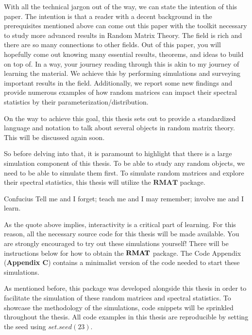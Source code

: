 With all the technical jargon out of the way, we can state the intention of this paper.
The intention is that a reader with a decent background in the prerequisites mentioned above can come out this paper with the toolkit necessary to study more advanced results in Random Matrix Theory.
The field is rich and there are so many connections to other fields. Out of this paper, you will hopefully come out knowing many essential results, theorems, and ideas to build on top of.
In a way, your journey reading through this is akin to my journey of learning the material. We achieve this by performing simulations and surveying important results in the field. Additionally, we report some
new findings and provide numerous examples of how random matrices can impact their spectral statistics by their parameterization/distribution.

On the way to achieve this goal, this thesis sets out to provide a standardized language and notation to talk about several objects in random matrix theory. This will be discussed again soon.

So before delving into that, it is paramount to highlight that there is a large simulation component of this thesis. To be able to study any random objects, we need to be able to simulate them first.
To simulate random matrices and explore their spectral statistics, this thesis will utilize the $\textbf{RMAT}$ package.


\begin{aquote}{Confucius}
Tell me and I forget; teach me and I may remember; involve me and I learn.
\end{aquote}

As the quote above implies, interactivity is a critical part of learning.
For this reason, all the necessary source code for this thesis will be made available. You are strongly encouraged to try out these simulations yourself!
There will be instructions below for how to obtain the ${\textbf{RMAT}}$ package. The Code Appendix (\textbf{Appendix C}) contains a minimalist version of the code
needed to start these simulations.

As mentioned before, this package was developed alongside this thesis in order to facilitate the simulation of these random matrices and spectral statistics.
To showcase the methodology of the simulations, code snippets will be sprinkled throughout the thesis. All code examples in this thesis are reproducible by setting
the seed using $set.seed(23)$.

